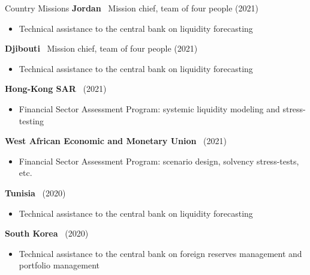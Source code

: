 \documentclass[usegeometry, 10pt, a4paper]{cv} %
\newcommand{\activite}[1]{\textbf{#1}\ }
\newcommand{\midreduce}{-0.5cm}
\begin{document}
\begin{rubriquetableau}[0.95\textwidth]{Country Missions}
  \activite{Jordan} Mission chief, team of four people (2021)\\
  \vspace{\midreduce}
  \begin{itemize}[label={}]
    \item \small{Technical assistance to the central bank on liquidity forecasting}
  \end{itemize}
  
  \activite{Djibouti} Mission chief, team of four people (2021)\\
  \vspace{\midreduce}
  \begin{itemize}[label={}]
    \item \small{Technical assistance to the central bank on liquidity forecasting}
  \end{itemize}

  \activite{Hong-Kong SAR} (2021)\\
  \vspace{\midreduce}
  \begin{itemize}[label={}]
    \item \small{Financial Sector Assessment Program: systemic liquidity modeling and stress-testing}
  \end{itemize}

  \activite{West African Economic and Monetary Union} (2021)\\
  \vspace{\midreduce}
  \begin{itemize}[label={}]
    \item \small{Financial Sector Assessment Program: scenario design, solvency stress-tests, etc.}
  \end{itemize}

  \activite{Tunisia} (2020)\\
  \vspace{\midreduce}
  \begin{itemize}[label={}]
    \item \small{Technical assistance to the central bank on liquidity forecasting}
  \end{itemize}

  \activite{South Korea} (2020)\\
  \vspace{\midreduce}
  \begin{itemize}[label={}]
    \item \small{Technical assistance to the central bank on foreign reserves
        management and portfolio management}
  \end{itemize}


\end{rubriquetableau}
\end{document}
